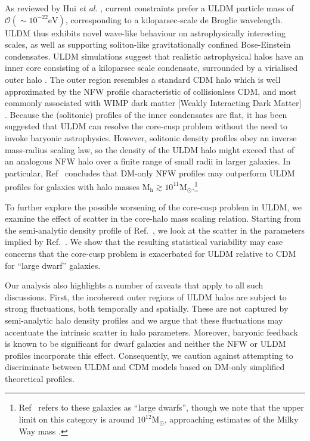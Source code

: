 \documentclass{pasa}%
\begin{document}
As reviewed by Hui {\em et al.\/} \cite{Hui:2016ltb}, current constraints prefer a ULDM particle mass of $\mathcal{O}(\sim 10^{-22}\mathrm{eV})$, corresponding to a kiloparsec-scale de Broglie wavelength. ULDM thus exhibits novel wave-like behaviour on astrophysically interesting scales, as well as supporting soliton-like gravitationally confined Bose-Einstein condensates. ULDM simulations suggest that realistic astrophysical halos have an inner core consisting of a kiloparsec scale condensate, surrounded by a virialised outer halo \cite{Schwabe:2016rze, Veltmaat:2018dfz}. The outer region resembles a standard CDM halo which is well approximated by the NFW profile characteristic of collisionless CDM, and most commonly associated with WIMP dark matter [Weakly Interacting Dark Matter] \cite{Navarro:1995iw}. 
Because the (solitonic) profiles of the inner condensates are flat, it has been suggested that ULDM can resolve the core-cusp problem without the need to invoke baryonic astrophysics. However, solitonic density profiles obey an inverse mass-radius scaling law, so the density of the ULDM halo might exceed that of an analogous NFW halo over a finite range of small radii in larger galaxies. In particular, Ref~\cite{Robles:2018fur} concludes that DM-only NFW profiles may outperform ULDM profiles for galaxies with halo masses $\mathrm{M_h} \gtrsim 10^{11} \mathrm{M}_{\odot}$.\footnote{ Ref~\cite{Robles:2018fur}  refers to these galaxies as ``large dwarfs'', though we note that the upper limit on this category is around $10^{12} \mathrm{M_{\odot}}$, approaching estimates of the Milky Way mass \cite{Watkins2019ApJ}.}


To further explore the possible worsening of the core-cusp problem in ULDM, we examine the effect of scatter in the core-halo mass scaling relation. Starting from the semi-analytic density profile of Ref.~\cite{Robles:2018fur}, we look at the scatter in the parameters implied by Ref.~\cite{Schive:2014hza}. We show that the resulting statistical variability may ease concerns that the core-cusp problem is exacerbated for ULDM relative to CDM for ``large dwarf'' galaxies. 

Our analysis also highlights a number of caveats that apply to all such discussions. First, the incoherent outer regions of ULDM halos are subject to strong fluctuations, both temporally and spatially. These are not captured by semi-analytic halo density profiles and we argue that these fluctuations may accentuate the intrinsic scatter in halo parameters. Moreover, baryonic feedback is known to be significant for dwarf galaxies \cite{2018MNRAS.473.5698D, Benitez-Llambay:2018} and neither the NFW or ULDM profiles incorporate this effect. Consequently, we caution against attempting to discriminate between ULDM and CDM models based on DM-only simplified theoretical profiles. 
\end{document}
